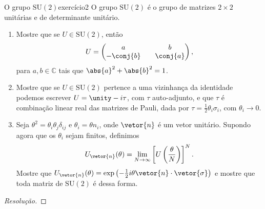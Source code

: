 \begin{exercício}{O grupo \(\mathrm{SU}(2)\)}{exercício2}
    O grupo \(\mathrm{SU}(2)\) é o grupo de matrizes \(2\times 2\) unitárias e de determinante unitário.
    \begin{enumerate}[label=(\alph*)]
        \item Mostre que se \(U \in \mathrm{SU}(2)\), então
            \begin{equation*}
                U = \begin{pmatrix}
                    a && b\\
                    -\conj{b} && \conj{a}
                \end{pmatrix},
            \end{equation*}
            para \(a,b \in \mathbb{C}\) tais que \(\abs{a}^2 + \abs{b}^2 = 1\).
        \item Mostre que se \(U \in \mathrm{SU}(2)\) pertence a uma vizinhança da identidade podemos escrever \(U = \unity - i \tau\), com \(\tau\) auto-adjunto, e que \(\tau\) é combinação linear real das matrizes de Pauli, dada por \(\tau = \frac12 \theta_i \sigma_i\), com \(\theta_i \to 0\).
        \item Seja \(\theta^2 = \theta_i \theta_j \delta_{ij}\) e \(\theta_i = \theta n_i\), onde \(\vetor{n}\) é um vetor unitário. Supondo agora que os \(\theta_i\) sejam finitos, definimos
            \begin{equation*}
                U_{\vetor{n}}(\theta) = \lim_{N\to \infty} \left[U\left(\frac{\theta}{N}\right)\right]^N.
            \end{equation*}
            Mostre que \(U_{\vetor{n}}(\theta) = \exp\left(-\frac12i\theta \vetor{n} \cdot \vetor{\sigma}\right)\) e mostre que toda matriz de \(\mathrm{SU}(2)\) é dessa forma.
    \end{enumerate}
\end{exercício}
\begin{proof}[Resolução]

\end{proof}
